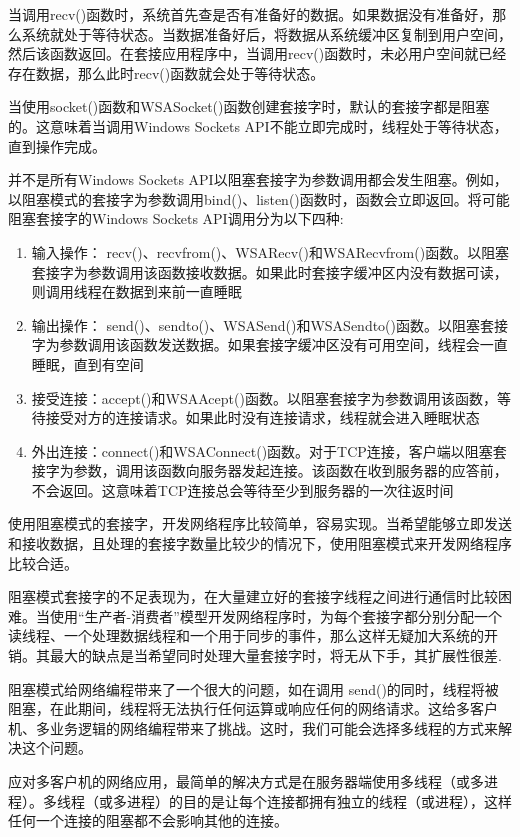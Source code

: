 \documentclass[UTF8,a4paper,8pt]{ctexbook}
\begin{document}
			当调用recv()函数时，系统首先查是否有准备好的数据。如果数据没有准备好，那么系统就处于等待状态。当数据准备好后，将数据从系统缓冲区复制到用户空间，然后该函数返回。在套接应用程序中，当调用recv()函数时，未必用户空间就已经存在数据，那么此时recv()函数就会处于等待状态。
			
			当使用socket()函数和WSASocket()函数创建套接字时，默认的套接字都是阻塞的。这意味着当调用Windows Sockets API不能立即完成时，线程处于等待状态，直到操作完成。
			
			并不是所有Windows Sockets API以阻塞套接字为参数调用都会发生阻塞。例如，以阻塞模式的套接字为参数调用bind()、listen()函数时，函数会立即返回。将可能阻塞套接字的Windows Sockets API调用分为以下四种:
			\begin{enumerate}[itemindent = 1em]
				\item 输入操作： recv()、recvfrom()、WSARecv()和WSARecvfrom()函数。以阻塞套接字为参数调用该函数接收数据。如果此时套接字缓冲区内没有数据可读，则调用线程在数据到来前一直睡眠
				\item 输出操作： send()、sendto()、WSASend()和WSASendto()函数。以阻塞套接字为参数调用该函数发送数据。如果套接字缓冲区没有可用空间，线程会一直睡眠，直到有空间
				\item 接受连接：accept()和WSAAcept()函数。以阻塞套接字为参数调用该函数，等待接受对方的连接请求。如果此时没有连接请求，线程就会进入睡眠状态
				\item 外出连接：connect()和WSAConnect()函数。对于TCP连接，客户端以阻塞套接字为参数，调用该函数向服务器发起连接。该函数在收到服务器的应答前，不会返回。这意味着TCP连接总会等待至少到服务器的一次往返时间
			\end{enumerate}
			
			使用阻塞模式的套接字，开发网络程序比较简单，容易实现。当希望能够立即发送和接收数据，且处理的套接字数量比较少的情况下，使用阻塞模式来开发网络程序比较合适。
			
			阻塞模式套接字的不足表现为，在大量建立好的套接字线程之间进行通信时比较困难。当使用“生产者-消费者”模型开发网络程序时，为每个套接字都分别分配一个读线程、一个处理数据线程和一个用于同步的事件，那么这样无疑加大系统的开销。其最大的缺点是当希望同时处理大量套接字时，将无从下手，其扩展性很差.
			
			阻塞模式给网络编程带来了一个很大的问题，如在调用 send()的同时，线程将被阻塞，在此期间，线程将无法执行任何运算或响应任何的网络请求。这给多客户机、多业务逻辑的网络编程带来了挑战。这时，我们可能会选择多线程的方式来解决这个问题。
			
			应对多客户机的网络应用，最简单的解决方式是在服务器端使用多线程（或多进程）。多线程（或多进程）的目的是让每个连接都拥有独立的线程（或进程），这样任何一个连接的阻塞都不会影响其他的连接。
			
\end{document}
